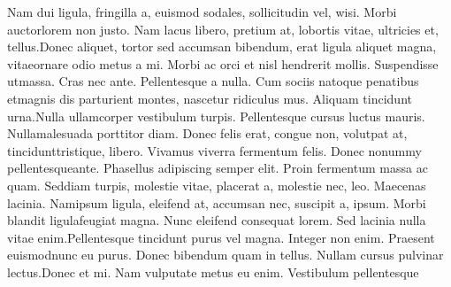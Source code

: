 Nam dui ligula, fringilla a, euismod sodales, sollicitudin vel, wisi. Morbi auctorlorem non justo. Nam lacus libero, pretium at, lobortis vitae, ultricies et, tellus.Donec aliquet, tortor sed accumsan bibendum, erat ligula aliquet magna, vitaeornare odio metus a mi. Morbi ac orci et nisl hendrerit mollis. Suspendisse utmassa. Cras nec ante. Pellentesque a nulla. Cum sociis natoque penatibus etmagnis dis parturient montes, nascetur ridiculus mus. Aliquam tincidunt urna.Nulla ullamcorper vestibulum turpis. Pellentesque cursus luctus mauris. Nullamalesuada porttitor diam. Donec felis erat, congue non, volutpat at, tincidunttristique, libero. Vivamus viverra fermentum  felis. Donec nonummy pellentesqueante. Phasellus adipiscing semper elit. Proin fermentum massa ac quam. Seddiam turpis, molestie vitae, placerat a, molestie nec, leo. Maecenas lacinia. Namipsum ligula, eleifend at, accumsan nec, suscipit a, ipsum. Morbi blandit ligulafeugiat magna. Nunc eleifend consequat lorem. Sed lacinia nulla vitae enim.Pellentesque tincidunt purus vel magna. Integer non enim. Praesent euismodnunc eu purus. Donec bibendum quam in tellus. Nullam cursus pulvinar lectus.Donec et mi. Nam vulputate metus eu enim. Vestibulum pellentesque